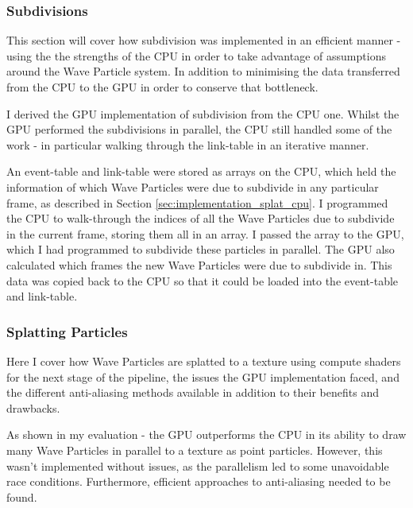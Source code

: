 \documentclass[12pt,a4paper,twoside]{report}
\begin{document}
\subsubsection{Subdivisions}

This section will cover how subdivision was implemented in an efficient manner
- using the the strengths of the CPU in order to take advantage of assumptions
around the Wave Particle system. In addition to minimising the data transferred
from the CPU to the GPU in order to conserve that bottleneck.

I derived the GPU implementation of subdivision from the CPU one. Whilst the
GPU performed the subdivisions in parallel, the CPU still handled some of the
work - in particular walking through the link-table in an iterative manner.

An event-table and link-table were stored as arrays on the CPU, which held the
information of which Wave Particles were due to subdivide in any particular
frame, as described in Section \ref{sec:implementation_splat_cpu}. I programmed
the CPU to walk-through the indices of all the Wave Particles due to subdivide
in the current frame, storing them all in an array. I passed the array to the
GPU, which I had programmed to subdivide these particles in parallel. The GPU
also calculated which frames the new Wave Particles were due to subdivide in.
This data was copied back to the CPU so that it could be loaded into the
event-table and link-table.


\subsubsection{Splatting Particles}

Here I cover how Wave Particles are splatted to a texture using compute
shaders for the next stage of the pipeline, the issues the GPU implementation
faced, and the different anti-aliasing methods available in addition to their
benefits and drawbacks.

As shown in my evaluation - the GPU outperforms the CPU in its ability to draw
many Wave Particles in parallel to a texture as point particles. However, this
wasn't implemented without issues, as the parallelism led to some unavoidable
race conditions. Furthermore, efficient approaches to anti-aliasing needed to
be found.
\end{document}
